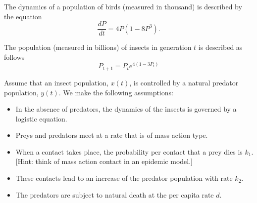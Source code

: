 \documentclass[12pt]{exam}
\begin{document}
\begin{questions}

\question[10]
The dynamics of a population of birds (measured in thousand) is described by the equation
\[
\frac{dP}{dt}=4P(1-8P^3).
\]

\vskip0.5cm
\question[10]
The population (measured in billions) of insects in generation $t$ is described as follows
$$P_{t+1}=P_t e^{4(1-3P_t)}$$




\vskip0.5cm
\question[20]
Assume that an insect population, $x(t)$, is controlled by a natural predator population, $y(t)$. We make the following assumptions:
\begin{itemize}
\item In the absence of predators, the dynamics of the insects is governed by a logistic equation.
\item Preys and predators meet at a rate that is of mass action type.
\item When a contact takes place, the probability per contact that a prey dies is $k_1$. [Hint: think of mass action contact in an epidemic model.]
\item These contacts lead to an increase of the predator population with rate $k_2$.
\item The predators are subject to natural death at the per capita rate $d$.
\end{itemize}
\end{questions}
\end{document}
